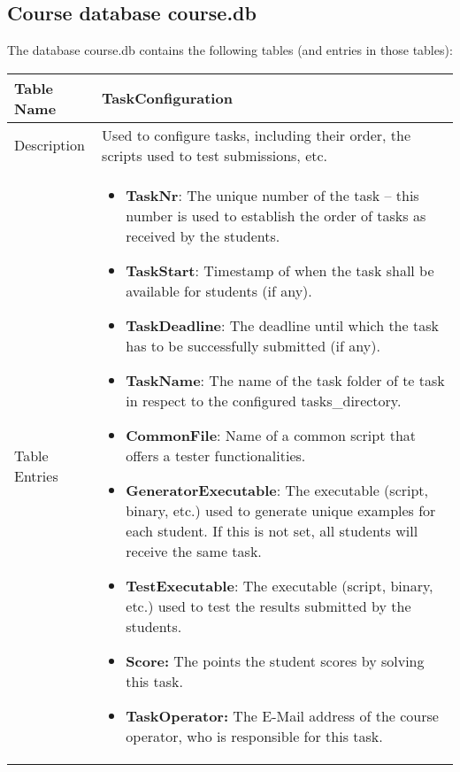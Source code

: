 \subsection{Course database course.db} \label{app:course.db}

The database course.db contains the following tables (and entries in those tables):

\begin{tabular}{|p{3cm}|p{10cm}|}
\hline
Table Name & TaskConfiguration \\
\hline
Description & Used to configure tasks, including their order, the scripts used to test 
	submissions, etc.\\
\hline
Table Entries & \begin{itemize}
    \item {\bf TaskNr}: The unique number of the task -- this number is used to establish 
		the order of tasks as received by the students.
    \item {\bf TaskStart}: Timestamp of when the task shall be available for students
		(if any). 
    \item {\bf TaskDeadline}: The deadline until which the task has to be successfully 
		submitted (if any).
    \item {\bf TaskName}: The name of the task folder of te task in respect to the 
	configured tasks\_directory.
	\item {\bf CommonFile}: Name of a common script that offers a tester functionalities.
    \item {\bf GeneratorExecutable}: The executable (script, binary, etc.) used to 
		generate unique examples for each student. If this is not set, all students will
		receive the same task.
    \item {\bf TestExecutable}: The executable (script, binary, etc.) used to test the 
		results submitted by the students.
    \item {\bf Score:} The points the student scores by solving this task.
    \item {\bf TaskOperator:} The E-Mail address of the course operator, who is 
		responsible for this task.
    \end{itemize}
    
\\
\hline
\end{tabular}

